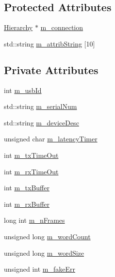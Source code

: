 \subsection*{Protected Attributes}
\begin{DoxyCompactItemize}
\item 
\hyperlink{classHierarchy}{Hierarchy} $\ast$ \hyperlink{classElement_abe3de7a5dbbc9a6dd2d7e012e5fdb266}{m\+\_\+connection}
\item 
std\+::string \hyperlink{classAttrib_a3414521d7a82476e874b25a5407b5e63}{m\+\_\+attrib\+String} \mbox{[}10\mbox{]}
\end{DoxyCompactItemize}
\subsection*{Private Attributes}
\begin{DoxyCompactItemize}
\item 
int \hyperlink{classUsbFTInterface_a91df5c0547e8be460bc087e27afe05aa}{m\+\_\+usb\+Id}
\item 
std\+::string \hyperlink{classUsbFTInterface_a031610ca38939734ec7431d80f5f299f}{m\+\_\+serial\+Num}
\item 
std\+::string \hyperlink{classUsbFTInterface_a500067688c32cdb3719fecf128e88dca}{m\+\_\+device\+Desc}
\item 
unsigned char \hyperlink{classUsbFTInterface_a0eefe6f2cee132da70176562cd126718}{m\+\_\+latency\+Timer}
\item 
int \hyperlink{classUsbFTInterface_af88e498a8ed759e35ae9e94f74ffcf56}{m\+\_\+tx\+Time\+Out}
\item 
int \hyperlink{classUsbFTInterface_a0153d99857eaa634e4b9fc1ec58caf52}{m\+\_\+rx\+Time\+Out}
\item 
int \hyperlink{classUsbFTInterface_a10385649160531f6976d55176bee1f2d}{m\+\_\+tx\+Buffer}
\item 
int \hyperlink{classUsbFTInterface_a7007c5112d381f5caefa133a42bd900d}{m\+\_\+rx\+Buffer}
\item 
long int \hyperlink{classUsbFTInterface_a40770504afc4173034c8a8d6c5f5962c}{m\+\_\+n\+Frames}
\item 
unsigned long \hyperlink{classUsbFTInterface_a91c81850db2579afa6a5296e0bf0dbef}{m\+\_\+word\+Count}
\item 
unsigned long \hyperlink{classUsbFTInterface_a05ccc38a60c4b921b835238b604b38d8}{m\+\_\+word\+Size}
\item 
unsigned int \hyperlink{classUsbFTInterface_ab3660cba031df164b2d2df6e4c40f291}{m\+\_\+fake\+Err}

\end{DoxyCompactItemize}
